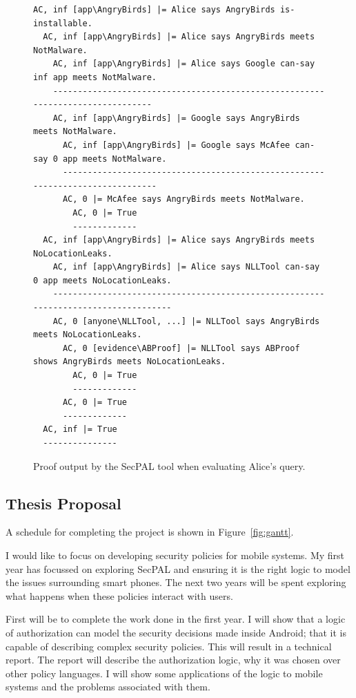 \documentclass[a4paper,sfsidenotes]{tufte-book}
\begin{document}
\begin{figure}\label{secpal:exampleproof}
  \begin{lstlisting}[basicstyle=\small\ttfamily,columns=flexible,mathescape]
AC, inf [app\AngryBirds] |= Alice says AngryBirds is-installable.
  AC, inf [app\AngryBirds] |= Alice says AngryBirds meets NotMalware.
    AC, inf [app\AngryBirds] |= Alice says Google can-say inf app meets NotMalware.
    -------------------------------------------------------------------------------
    AC, inf [app\AngryBirds] |= Google says AngryBirds meets NotMalware.
      AC, inf [app\AngryBirds] |= Google says McAfee can-say 0 app meets NotMalware.
      ------------------------------------------------------------------------------
      AC, 0 |= McAfee says AngryBirds meets NotMalware.
        AC, 0 |= True
        -------------
  AC, inf [app\AngryBirds] |= Alice says AngryBirds meets NoLocationLeaks.
    AC, inf [app\AngryBirds] |= Alice says NLLTool can-say 0 app meets NoLocationLeaks.
    -----------------------------------------------------------------------------------
    AC, 0 [anyone\NLLTool, ...] |= NLLTool says AngryBirds meets NoLocationLeaks.
      AC, 0 [evidence\ABProof] |= NLLTool says ABProof shows AngryBirds meets NoLocationLeaks.
        AC, 0 |= True
        -------------
      AC, 0 |= True
      -------------
  AC, inf |= True
  ---------------
  \end{lstlisting}
  \caption{Proof output by the SecPAL tool when evaluating Alice's query.}
\end{figure}

\subsection{Thesis Proposal}

A schedule for completing the project is shown in Figure~\ref{fig:gantt}.

I would like to focus on developing security policies for mobile systems.
My first year has focussed on exploring SecPAL
and ensuring it is the right logic to model the issues surrounding smart phones.
The next two years will be spent exploring what happens when these policies
interact with users.

First will be to complete the work done in the first year. I will show that
a logic of authorization can model the security decisions made inside Android;
that it is capable of describing complex security policies.  This will
result in a technical report. The report will describe the authorization logic, why it
was chosen over other policy languages.  I will show some applications of
the logic to mobile systems and the problems associated with them.
\end{document}
